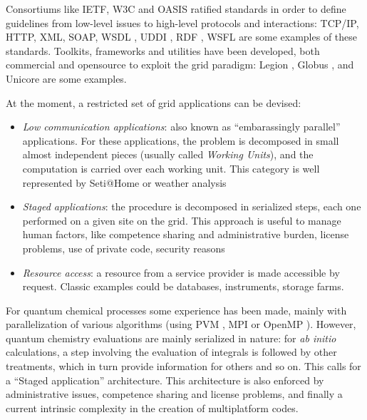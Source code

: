 Consortiums like IETF\cite{ietf-site}, W3C\cite{w3c-site} and
OASIS\cite{oasis-site} ratified standards in order to define
guidelines from low-level issues to high-level protocols and interactions:
TCP/IP\cite{tcp-site,ip-site}, HTTP, XML\cite{xml-site},
SOAP\cite{soap-site}, WSDL \cite{wsdl-site}, UDDI \cite{uddi-site}, RDF
\cite{rdf-site}, WSFL \cite{wsfl-site} are some examples of these standards.
Toolkits, frameworks and utilities have been developed, both commercial and
opensource to exploit the grid paradigm: Legion \cite{legion-site}, Globus
\cite{globus-site,ogsa-site}, and Unicore \cite{unicore-site} are some examples.

At the moment, a restricted set of grid applications can be devised:
\begin{itemize}
\item \textit{Low communication applications}: also known as ``embarassingly
parallel'' applications. For these applications, the problem is decomposed in
small almost independent pieces (usually called \textit{Working Units}),
and the computation is carried over each working unit. This category is
well represented by Seti@Home\cite{seti-site} or weather analysis
\item \textit{Staged applications}: the procedure is decomposed in
serialized steps, each one performed on a given site on the grid. This
approach is useful to manage human factors, like competence sharing and
administrative burden, license problems, use of private code, security
reasons
\item \textit{Resource access}: a resource from a service provider is made
accessible by request. Classic examples could be databases, instruments,
storage farms.
\end{itemize}

For quantum chemical processes some experience has been made, mainly with
parallelization of various algorithms (using PVM \cite{pvm-site}, MPI \cite{mpi-site} or OpenMP
\cite{openmp-site}). However, quantum chemistry evaluations are mainly
serialized in nature: for \textit{ab initio} calculations, a step involving
the evaluation of integrals is followed by other treatments, which in turn
provide information for others and so on.  This calls for a ``Staged
application'' architecture. This architecture is also enforced by
administrative issues, competence sharing and license problems, and finally
a current intrinsic complexity in the creation of multiplatform codes.







